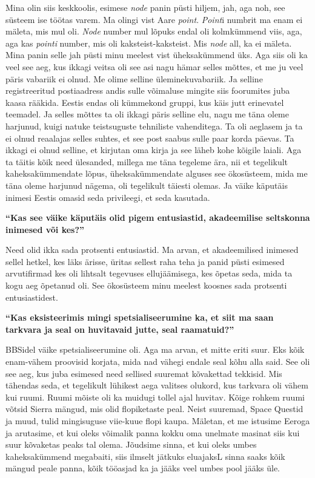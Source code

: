 Mina olin siis keskkoolis, esimese \emph{node} panin püsti hiljem, jah, aga noh, see süsteem ise töötas varem. Ma olingi vist Aare \emph{point}. \emph{Point}i numbrit ma enam ei mäleta, mis mul oli. \emph{Node} number mul lõpuks endal oli kolmkümmend viis, aga, aga kas \emph{pointi} number, mis oli kaksteist-kaksteist. Mis \emph{node} all, ka ei mäleta. Mina panin selle jah püsti minu meelest vist üheksakümmend üks. Aga siis oli ka veel see aeg, kus ikkagi veitsa oli see asi nagu hämar selles mõttes, et me ju veel päris vabariik ei olnud. Me olime selline üleminekuvabariik. Ja selline registreeritud postiaadress andis sulle  võimaluse mingite siis foorumites juba kaasa rääkida. Eestis endas oli kümmekond gruppi, kus käis jutt erinevatel teemadel. Ja selles mõttes ta oli ikkagi päris selline elu, nagu me täna oleme harjunud, kuigi natuke teistsuguste tehniliste vahenditega. Ta oli aeglasem ja ta ei olnud reaalajas selles suhtes, et see post saabus sulle paar korda päevas. Ta ikkagi ei olnud selline, et kirjutan oma kirja ja see läheb kohe kõigile laiali. Aga ta täitis kõik need ülesanded, millega me täna tegeleme ära, nii et tegelikult  kaheksakümmendate lõpus, üheksakümmendate alguses see ökosüsteem, mida me täna oleme harjunud nägema, oli tegelikult täiesti olemas. Ja väike käputäis inimesi Eestis omasid seda privileegi, et seda kasutada. 

\textbf{\enquote{Kas see väike käputäis olid pigem entusiastid, akadeemilise seltskonna inimesed või kes?}}

Need olid ikka sada protsenti entusiastid. Ma arvan, et akadeemilised inimesed sellel hetkel, kes läks ärisse, üritas sellest raha teha ja panid püsti esimesed arvutifirmad kes oli lihtsalt tegevuses  ellujäämisega, kes õpetas seda, mida ta kogu aeg õpetanud oli. See ökosüsteem minu meelest koosnes sada protsenti entusiastidest.

\textbf{\enquote{Kas eksisteerimis mingi spetsialiseerumine ka, et siit ma saan tarkvara ja seal on huvitavaid jutte, seal raamatuid?}}

BBSidel väike spetsialiseerumine oli. Aga ma arvan, et mitte eriti suur. Eks kõik enam-vähem proovisid korjata, mida nad vähegi endale seal kõhu alla said. See oli see aeg, kus juba esimesed need sellised suuremat kõvakettad tekkisid. Mis tähendas seda, et tegelikult lühikest aega valitses olukord, kus tarkvara oli vähem kui ruumi. Ruumi mõiste oli ka muidugi tollel ajal huvitav. Kõige rohkem ruumi võtsid Sierra mängud, mis olid flopiketaste peal. Neist suuremad, Space Questid ja muud, tulid mingisuguse viie-kuue flopi kaupa. Mäletan, et me istusime Eeroga ja arutasime, et kui oleks võimalik panna kokku oma unelmate masinat siis kui suur kõvaketas peaks tal olema. Jõudsime sinna, et kui oleks umbes kaheksakümmend megabaiti, siis ilmselt jätkuks eluajaksL sinna saaks kõik mängud peale panna, kõik tööasjad ka ja jääks veel umbes pool jääks üle.

